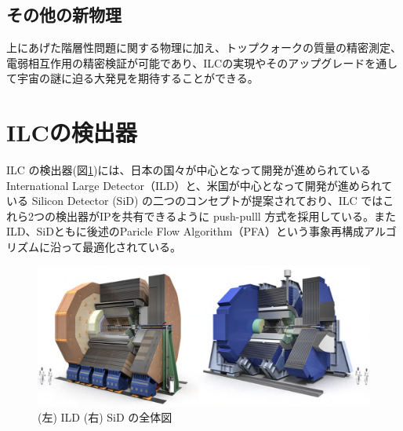 \subsection{その他の新物理}
上にあげた階層性問題に関する物理に加え、トップクォークの質量の精密測定、電弱相互作用の精密検証が可能であり、ILCの実現やそのアップグレードを通して宇宙の謎に迫る大発見を期待することができる。
\section{ILCの検出器}
ILC の検出器(図\ref{detector})には、日本の国々が中心となって開発が進められている International Large Detector（ILD）と、米国が中心となって開発が進められている Silicon Detector (SiD) の二つのコンセプトが提案されており、ILC ではこれら2つの検出器がIPを共有できるように push-pulll 方式を採用している。またILD、SiDともに後述のParicle Flow Algorithm（PFA）という事象再構成アルゴリズムに沿って最適化されている。
\begin{figure}[h]
	\begin{center}
 \includegraphics[keepaspectratio, scale=0.4]
 	{Figure/Introduction/detector.png}
 		\caption{(左) ILD (右) SiD の全体図}
 		\label{detector}
	\end{center}
\end{figure}
